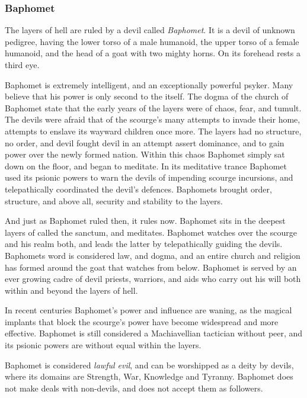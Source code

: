 \subsubsection{Baphomet}
\label{sec:Baphomet}

The layers of hell are ruled by a devil called \emph{Baphomet}. It is a devil
of unknown pedigree, having the lower torso of a male humanoid, the upper torso
of a female humanoid, and the head of a goat with two mighty horns. On its
forehead rests a third eye.

Baphomet is extremely intelligent, and an exceptionally powerful psyker. Many
believe that his power is only second to the  itself. The
dogma of the church of Baphomet state that the early years of the layers were
of chaos, fear, and tumult. The devils were afraid that of the scourge's many
attempts to invade their home, attempts to enslave its wayward children once
more. The layers had no structure, no order, and devil fought devil in an
attempt assert dominance, and to gain power over the newly formed nation. Within
this chaos Baphomet simply sat down on the floor, and began to meditate. In
its meditative trance Baphomet used its psionic powers to warn the devils of
impending scourge incursions, and telepathically coordinated the devil's
defences. Baphomets brought order, structure, and above all, security and
stability to the layers.

And just as Baphomet ruled then, it rules now. Baphomet sits in the deepest
layers of  called the sanctum, and meditates. Baphomet
watches over the scourge and his realm both, and leads the latter by
telepathically guiding the devils. Baphomets word is considered law, and
dogma, and an entire church and religion has formed around the goat that
watches from below. Baphomet is served by an ever growing cadre of devil
priests, warriors, and aids who carry out his will both within and beyond
the layers of hell.

In recent centuries Baphomet's power and influence are waning, as the magical
implants that block the scourge's power have become widespread and more
effective. Baphomet is still considered a Machiavellian tactician without
peer, and its psionic powers are without equal within the layers.


\begin{35e}
  Baphomet is considered \emph{lawful evil}, and can be worshipped as a
  deity by devils, where its domains are Strength, War, Knowledge and
  Tyranny. Baphomet does not make deals with non-devils, and does not
  accept them as followers.
\end{35e}

